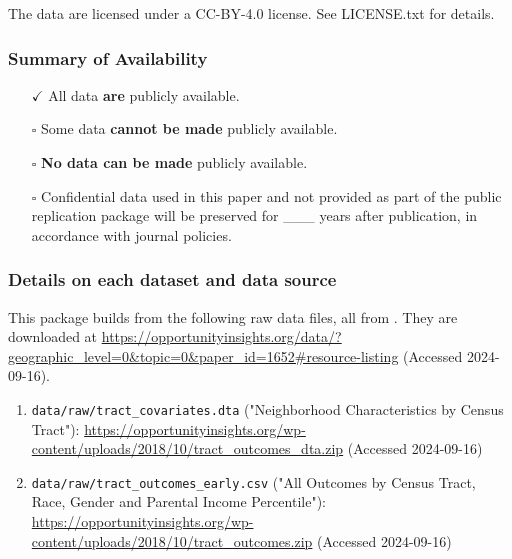 \documentclass[10pt]{article}
\providecommand{\tightlist}{%
  \setlength{\itemsep}{0pt}\setlength{\parskip}{0pt}}
\begin{document}

The data are licensed under a CC-BY-4.0 license. See LICENSE.txt for
details.

\hypertarget{summary-of-availability}{%
\subsubsection{Summary of Availability}\label{summary-of-availability}}

\begin{itemize}
\tightlist
\item[$\checkmark$]
  All data \textbf{are} publicly available.
\item[$\square$]
  Some data \textbf{cannot be made} publicly available.
\item[$\square$]
  \textbf{No data can be made} publicly available.
\end{itemize}


\begin{itemize}
\tightlist
\item[$\square$]
  Confidential data used in this paper and not provided as part of the
  public replication package will be preserved for \_\_\_ years after
  publication, in accordance with journal policies.
\end{itemize}

\hypertarget{details-on-each-data-source}{%
\subsubsection{Details on each dataset and data source}
\label{details-on-each-data-source}}

This package builds from the following raw data files, all from \citet{DVN/NKCQM1_2022}.
They are downloaded at
\url{https://opportunityinsights.org/data/?geographic_level=0&topic=0&paper_id=1652#resource-listing}
(Accessed 2024-09-16).
\begin{enumerate}
  \item    \texttt{data/raw/tract\_covariates.dta} ("Neighborhood Characteristics by Census
  Tract"):
  \url{https://opportunityinsights.org/wp-content/uploads/2018/10/tract_outcomes_dta.zip}
      (Accessed 2024-09-16)
    
    \item \texttt{data/raw/tract\_outcomes\_early.csv} ("All Outcomes by Census Tract,
    Race, Gender and
    Parental Income Percentile"):
    \url{https://opportunityinsights.org/wp-content/uploads/2018/10/tract_outcomes.zip}
    (Accessed 2024-09-16)

\end{enumerate}
\end{document}
